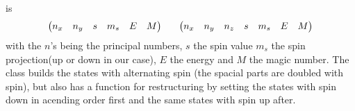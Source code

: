     is
        \begin{equation}
            \begin{aligned}
                \begin{pmatrix}
                    n_x & n_y & s & m_s & E & M
                \end{pmatrix}
                \indent
                \begin{pmatrix}
                    n_x & n_y & n_z & s & m_s & E & M
                \end{pmatrix}
            \end{aligned}
        \end{equation}
    with the $n$'s being the principal numbers, $s$ the spin value $m_s$ the
    spin projection(up or down in our case), $E$ the energy and $M$ the magic
    number. The  class builds the states with alternating
    spin (the spacial parts are doubled with spin), but also has a function for
    restructuring by setting the states with spin down in acending order first
    and the same states with spin up after.

